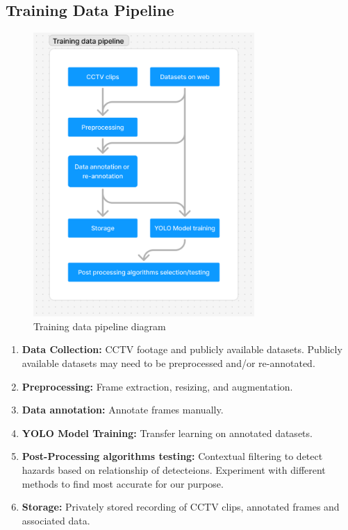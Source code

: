 \documentclass[12pt]{article}
\begin{document}
\subsection{Training Data Pipeline}
\begin{figure}[H]
    \centering
    \includegraphics[width=0.75\textwidth]{training_pipeline.png}
    \caption{Training data pipeline diagram}
    \label{fig:pipeline1}
\end{figure}

\begin{enumerate}
    \item \textbf{Data Collection:} CCTV footage and publicly available datasets. Publicly available datasets may need to be preprocessed and/or re-annotated.
    \item \textbf{Preprocessing:} Frame extraction, resizing, and augmentation.
    \item \textbf{Data annotation:} Annotate frames manually.
    \item \textbf{YOLO Model Training:} Transfer learning on annotated datasets.    
    \item \textbf{Post-Processing algorithms testing:} Contextual filtering to detect hazards based on relationship of detecteions. Experiment with different methods to find most accurate for our purpose.
    \item \textbf{Storage:} Privately stored recording of CCTV clips, annotated frames and associated data.
\end{enumerate}
\end{document}
